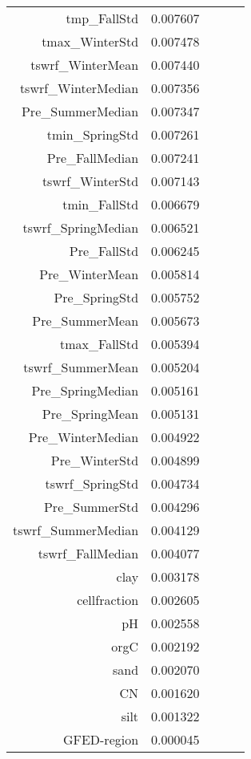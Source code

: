 \begin{tabular}{rrrrr}
tmp_FallStd & 0.007607 \\
tmax_WinterStd & 0.007478 \\
tswrf_WinterMean & 0.007440 \\
tswrf_WinterMedian & 0.007356 \\
Pre_SummerMedian & 0.007347 \\
tmin_SpringStd & 0.007261 \\
Pre_FallMedian & 0.007241 \\
tswrf_WinterStd & 0.007143 \\
tmin_FallStd & 0.006679 \\
tswrf_SpringMedian & 0.006521 \\
Pre_FallStd & 0.006245 \\
Pre_WinterMean & 0.005814 \\
Pre_SpringStd & 0.005752 \\
Pre_SummerMean & 0.005673 \\
tmax_FallStd & 0.005394 \\
tswrf_SummerMean & 0.005204 \\
Pre_SpringMedian & 0.005161 \\
Pre_SpringMean & 0.005131 \\
Pre_WinterMedian & 0.004922 \\
Pre_WinterStd & 0.004899 \\
tswrf_SpringStd & 0.004734 \\
Pre_SummerStd & 0.004296 \\
tswrf_SummerMedian & 0.004129 \\
tswrf_FallMedian & 0.004077 \\
clay & 0.003178 \\
cellfraction & 0.002605 \\
pH & 0.002558 \\
orgC & 0.002192 \\
sand & 0.002070 \\
CN & 0.001620 \\
silt & 0.001322 \\
GFED-region & 0.000045 \\
\bottomrule
\end{tabular}
